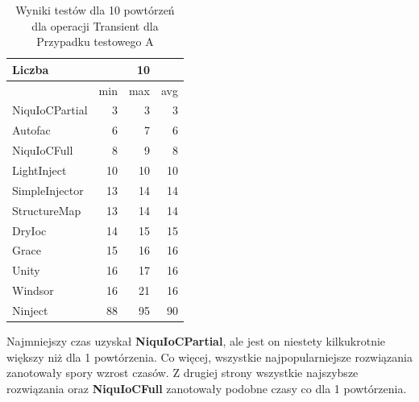 \documentclass[12pt]{article}
\begin{document}
\begin{table}[H]
\captionsetup{belowskip=0pt,aboveskip=0pt}
\begin{center}
\begin{small}
	\begin{tabular}{ | l | r r r | }
    		\hline
Liczba & & 10 & \\ \hline
 & min & max & avg \\ \hline
NiquIoCPartial & 3 & 3 & 3 \\ \hline
Autofac & 6 & 7 & 6 \\ \hline
NiquIoCFull & 8 & 9 & 8 \\ \hline
LightInject & 10 & 10 & 10 \\ \hline
SimpleInjector & 13 & 14 & 14 \\ \hline
StructureMap & 13 & 14 & 14 \\ \hline
DryIoc & 14 & 15 & 15 \\ \hline
Grace & 15 & 16 & 16 \\ \hline
Unity & 16 & 17 & 16 \\ \hline
Windsor & 16 & 21 & 16 \\ \hline
Ninject & 88 & 95 & 90 \\ \hline
  	\end{tabular}
\end{small}
\end{center}
\caption{Wyniki testów dla 10 powtórzeń dla operacji Transient dla Przypadku testowego A}
\label{TestCaseA_Transient10}
\end{table} 
Najmniejszy czas uzyskał \textbf{NiquIoCPartial}, ale jest on niestety kilkukrotnie większy niż dla 1 powtórzenia. Co więcej, wszystkie najpopularniejsze rozwiązania zanotowały spory wzrost czasów. Z drugiej strony wszystkie najszybsze rozwiązania oraz \textbf{NiquIoCFull} zanotowały podobne czasy co dla 1 powtórzenia.
\\ \\
\end{document}
